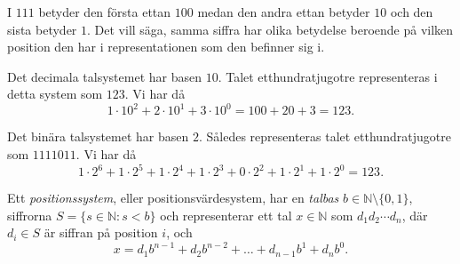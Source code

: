 \documentclass{beamer}
\newcommand{\N}{\mathbb{N}}
\theoremstyle{definition}
\theoremstyle{remark}
\begin{document}
\begin{frame}{\insertsubsectionhead}
  \begin{example}\label{ex:PositionensBetydelse}
    I \(111\) betyder den första ettan \(100\) medan den andra ettan
    betyder \(10\) och den sista betyder \(1\).
    Det vill säga, samma siffra har olika betydelse beroende på vilken position
    den har i representationen som den befinner sig i.
  \end{example}
\end{frame}

\begin{frame}{\insertsubsectionhead}
  \begin{example}\label{ex:DecimaltPosistionssystem}
    Det decimala talsystemet har basen \(10\).
    Talet etthundratjugotre representeras i detta system som \(123\).
    Vi har då
    \[1\cdot10^2 + 2\cdot10^1 + 3\cdot10^0 = 100 + 20 + 3 = 123.\]
  \end{example}

  \begin{example}\label{ex:BinartPositionssystem}
    Det binära talsystemet har basen \(2\).
    Således representeras talet etthundratjugotre som \(1111011\).
    Vi har då
    \[1\cdot2^6 + 1\cdot2^5 + 1\cdot 2^4 + 1\cdot2^3 + 0\cdot2^2 +
    1\cdot2^1 + 1\cdot2^0 = 123.\]
  \end{example}
\end{frame}

\begin{frame}{\insertsubsectionhead}
  \begin{definition}
    \label{def:Positionssystem}
    Ett \emph{positionssystem}, eller positionsvärdesystem, har en
    \emph{talbas} \(b \in \N \setminus \{0,1\}\),
    siffrorna \(S=\{s\in\N\colon s<b\}\) och representerar ett tal \(x\in\N\) som
    \(d_1d_2\cdots d_n\), där \(d_i \in S\) är siffran på position \(i\), och
    \begin{equation}
      \nonumber
      x = d_1b^{n-1} + d_2b^{n-2} + \ldots + d_{n-1}b^1 + d_nb^0.
    \end{equation}
  \end{definition}
\end{frame}
\end{document}
